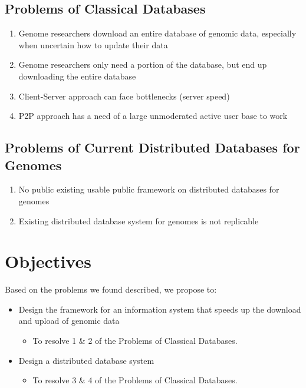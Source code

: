 \documentclass[acmsmall]{acmart}
\begin{document}
\subsection{Problems of Classical Databases}
\begin{enumerate}
\item Genome researchers download an entire database of genomic data, especially when uncertain how to update their data
\item Genome researchers only need a portion of the database, but end up downloading the entire database
\item Client-Server approach can face bottlenecks (server speed)
\item P2P approach has a need of a large unmoderated active user base to work

\end{enumerate}

\subsection{Problems of Current Distributed Databases for Genomes}
\begin{enumerate}
    \item No public existing usable public framework on distributed databases for genomes
    \item Existing distributed database system for genomes is not replicable
\end{enumerate}

\section{Objectives}

Based on the problems we found described, we propose to:

\begin{itemize}
    \item Design the framework for an information system that speeds up the download and upload of genomic data
    \begin{itemize} 
        \item To resolve 1 \& 2 of the Problems of Classical Databases. 
    \end{itemize}
    \item  Design a distributed database system
    \begin{itemize}
        \item To resolve 3 \& 4 of the Problems of Classical Databases. 
    \end{itemize}
\end{itemize}
\end{document}
